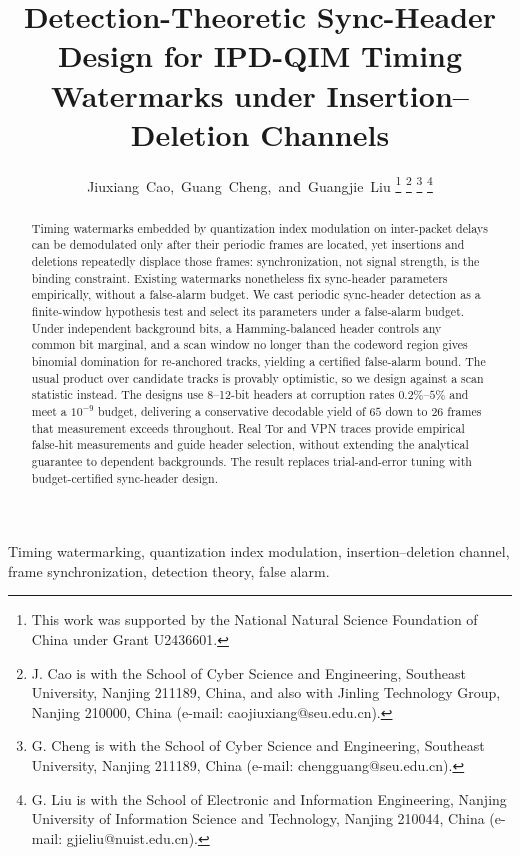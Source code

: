 \documentclass[journal]{IEEEtran}
\begin{document}
\title{Detection-Theoretic Sync-Header Design for IPD-QIM Timing Watermarks under Insertion--Deletion Channels}

\author{Jiuxiang~Cao,~Guang~Cheng,~and~Guangjie~Liu%
\thanks{This work was supported by the National Natural Science Foundation of China under Grant U2436601.}%
\thanks{J. Cao is with the School of Cyber Science and Engineering, Southeast University, Nanjing 211189, China, and also with Jinling Technology Group, Nanjing 210000, China (e-mail: caojiuxiang@seu.edu.cn).}%
\thanks{G. Cheng is with the School of Cyber Science and Engineering, Southeast University, Nanjing 211189, China (e-mail: chengguang@seu.edu.cn).}%
\thanks{G. Liu is with the School of Electronic and Information Engineering, Nanjing University of Information Science and Technology, Nanjing 210044, China (e-mail: gjieliu@nuist.edu.cn).}}

\maketitle

\begin{abstract}
Timing watermarks embedded by quantization index modulation on inter-packet delays can be demodulated only after their periodic frames are located, yet insertions and deletions repeatedly displace those frames: synchronization, not signal strength, is the binding constraint. Existing watermarks nonetheless fix sync-header parameters empirically, without a false-alarm budget. We cast periodic sync-header detection as a finite-window hypothesis test and select its parameters under a false-alarm budget. Under independent background bits, a Hamming-balanced header controls any common bit marginal, and a scan window no longer than the codeword region gives binomial domination for re-anchored tracks, yielding a certified false-alarm bound. The usual product over candidate tracks is provably optimistic, so we design against a scan statistic instead. The designs use 8--12-bit headers at corruption rates $0.2\%$--$5\%$ and meet a $10^{-9}$ budget, delivering a conservative decodable yield of $65$ down to $26$ frames that measurement exceeds throughout. Real Tor and VPN traces provide empirical false-hit measurements and guide header selection, without extending the analytical guarantee to dependent backgrounds. The result replaces trial-and-error tuning with budget-certified sync-header design.
\end{abstract}

\begin{IEEEkeywords}
Timing watermarking, quantization index modulation, insertion--deletion channel, frame synchronization, detection theory, false alarm.
\end{IEEEkeywords}
\end{document}
